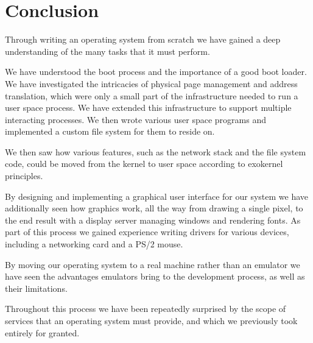 \documentclass{report}
\begin{document}
% 

\chapter{Conclusion}
Through writing an operating system from scratch we have gained a deep
understanding of the many tasks that it must perform. 

We have understood the boot process and the importance of a good boot loader.
We have investigated the intricacies of physical page management and address
translation, which were only a small part of the infrastructure needed to run
a user space process. We have extended this infrastructure to support multiple
interacting processes. We then wrote various user space programs and
implemented a custom file system for them to reside on.  

We then saw how various features, such as the network stack and the file
system code, could be moved from the kernel to user space according to exokernel
principles.

By designing and implementing a graphical user interface for our system we
have additionally seen how graphics work, all the way from drawing a single
pixel, to the end result with a display server managing
windows and rendering fonts. As part of this process we gained experience
writing drivers for various devices, including a networking card and a PS/2
mouse.

By moving our operating system to a real machine rather than an emulator we
have seen the advantages emulators bring to the development process, as well
as their limitations.

Throughout this process we have been repeatedly surprised by the scope of
services that an operating system must provide, and which we previously took
entirely for granted.
\end{document}
